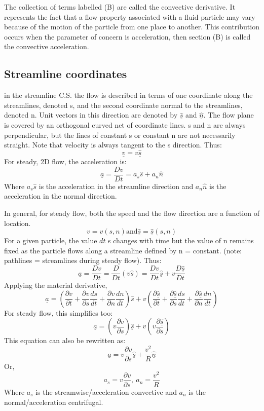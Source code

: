 \documentclass[class=report, crop=false, 12pt,a4paper]{standalone}
\begin{document}
The collection of terms labelled (B) are called the convective derivative. It represents the fact that a flow property associated with a fluid particle may vary because of the motion of the particle from one place to another. This contribution occurs when the parameter of concern is acceleration, then section (B) is called the convective acceleration. 
\subsection{Streamline coordinates}
in the streamline C.S. the flow is described in terms of one coordinate along the streamlines, denoted s, and the second coordinate normal to the streamlines, denoted n. Unit vectors in this direction are denoted by \( \underline{\hat{s}} \) and \( \underline{\hat{n}} \). The flow plane is covered by an orthogonal curved net of coordinate lines. s and n are always perpendicular, but the lines of constant s or constant n are not necessarily straight. Note that velocity is always tangent to the s direction. Thus:
\[ \underline{v} = v\underline{\hat{s}} \]
For steady, 2D flow, the acceleration is:
\[ \underline{a} = \frac{Dv}{Dt} = a_s \hat{s} + a_n \hat{n}\]
Where \( a_s \hat{s} \) is the acceleration in the streamline direction and \( a_n \hat{n} \) is the acceleration in the normal direction. 

In general, for steady flow, both the speed and the flow direction are a function of location.
\[ v = v(s, n) \textrm{and} \underline{\hat{s}} = \underline{\hat{s}}(s, n) \]
For a given particle, the value \(dt \) s changes with time but the value of n remains fixed as the particle flows along a streamline defined by n = constant. (note: pathlines = streamlines during steady flow). Thus: 
\[ \underline{a} = \frac{Dv}{Dt} = \frac{D}{Dt}(v\hat{s}) = \frac{Dv}{Dt}\underline{\hat{s}} + v \frac{D\underline{\hat{s}}}{Dt} \]
Applying the material derivative,
\[ \underline{a} = \left( \frac{\partial v}{\partial t} + \frac{\partial v}{\partial s}\frac{ds}{dt} + \frac{\partial v}{\partial n}\frac{dn}{dt} \right) \hat{s} + v \left( \frac{\partial \underline{\hat{s}}}{\partial t} + \frac{\partial \underline{\hat{s}}}{\partial s}\frac{ds}{dt} + \frac{\partial \underline{\hat{s}}}{\partial n}\frac{dn}{dt} \right) \]
For steady flow, this simplifies too:
\[ \underline{a} = \left( v\frac{\partial v}{\partial s} \right) \underline{\hat{s}} + v \left( v\frac{\partial \underline{\hat{s}}}{\partial s} \right) \]
This equation can also be rewritten as:
\[ \underline{a} = v\frac{\partial v}{\partial s} \underline{\hat{s}} + \frac{v^2}{R} \underline{\hat{n}} \]
Or,
\[ a_s = v\frac{\partial v}{\partial s}, \ a_n = \frac{v^2}{R} \]
Where \(a_s\) is the streamwise/acceleration convective and \(a_n\) is the normal/acceleration centrifugal.
\end{document}
